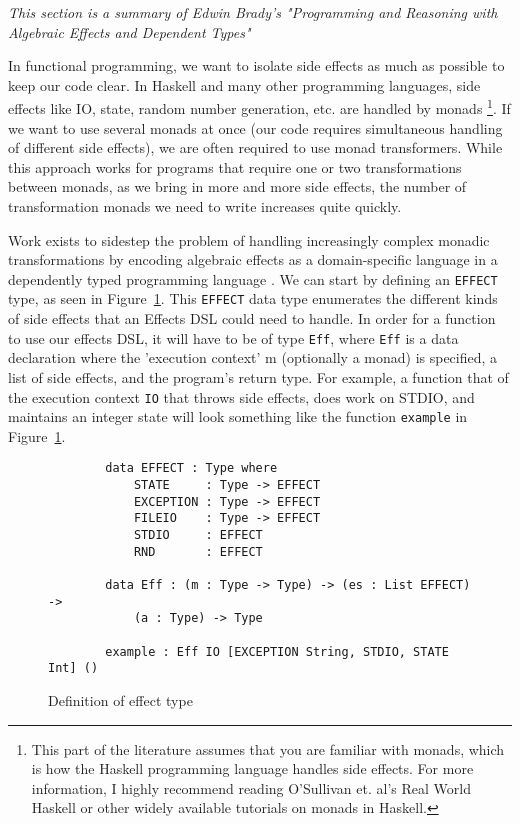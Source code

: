 \textit{This section is a summary of Edwin Brady's "Programming and Reasoning
with Algebraic Effects and Dependent Types" \cite{algebraic}}

In functional programming, we want to isolate side effects as much as possible
to keep our code clear. In Haskell and many other programming languages, side
effects like IO, state, random number generation, etc. are handled by monads
\cite{realworldhaskell}\footnote{This part of the literature assumes that you
are familiar with monads, which is how the Haskell programming language handles
side effects. For more information, I highly recommend reading O'Sullivan et.
al's Real World Haskell or other widely available tutorials on monads in
Haskell.}. If we want to use several monads at once (our code requires
simultaneous handling of different side effects), we are often required to use
monad transformers. While this approach works for programs that require one or
two transformations between monads, as we bring in more and more side effects,
the number of transformation monads we need to write increases quite quickly. 

Work exists to sidestep the problem of handling increasingly complex monadic
transformations by encoding algebraic effects as a domain-specific language in a
dependently typed programming language \cite{algebraic}. We can start by
defining an \texttt{EFFECT} type, as seen in Figure~\ref{effects_def}. This
\texttt{EFFECT} data type enumerates the different kinds of side effects that an
Effects DSL could need to handle. In order for a function to use our effects
DSL, it will have to be of type \texttt{Eff}, where \texttt{Eff} is a data
declaration where the 'execution context' m (optionally a monad) is specified, a
list of side effects, and the program's return type. For example, a function
that of the execution context \texttt{IO} that throws side effects, does work on
STDIO, and maintains an integer state will look something like the function
\texttt{example} in Figure~\ref{effects_def}. 

\begin{figure}[ht!!!!!!!!!!!]
    \caption{Definition of effect type}
    \label{effects_def}
    \begin{lstlisting}
        data EFFECT : Type where
            STATE     : Type -> EFFECT
            EXCEPTION : Type -> EFFECT
            FILEIO    : Type -> EFFECT
            STDIO     : EFFECT
            RND       : EFFECT
        
        data Eff : (m : Type -> Type) -> (es : List EFFECT) -> 
            (a : Type) -> Type
    
        example : Eff IO [EXCEPTION String, STDIO, STATE Int] ()
    \end{lstlisting}
\end{figure}

